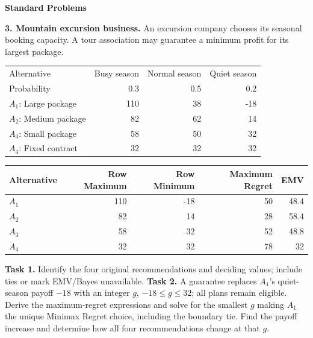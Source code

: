 \begin{studentproblem}
\textbf{Standard Problems}\par\smallskip
\textbf{3. Mountain excursion business.} An excursion company chooses its seasonal booking capacity. A tour association may guarantee a minimum profit for its largest package.
\begin{center}\begin{tabular}{lrrr}\toprule Alternative & Busy season & Normal season & Quiet season\\
Probability & 0.3 & 0.5 & 0.2\\
\midrule
$A_1$: Large package & 110 & 38 & -18\\
$A_2$: Medium package & 82 & 62 & 14\\
$A_3$: Small package & 58 & 50 & 32\\
$A_4$: Fixed contract & 32 & 32 & 32\\
\bottomrule\end{tabular}\end{center}
\begin{center}\begin{tabular}{lrrrr}\toprule Alternative & Row Maximum & Row Minimum & Maximum Regret & EMV\\\midrule
$A_1$ & 110 & -18 & 50 & 48.4\\
$A_2$ & 82 & 14 & 28 & 58.4\\
$A_3$ & 58 & 32 & 52 & 48.8\\
$A_4$ & 32 & 32 & 78 & 32\\
\bottomrule\end{tabular}\end{center}
\textbf{Task 1.} Identify the four original recommendations and deciding values; include ties or mark EMV/Bayes unavailable.
\choices
\textbf{Task 2.} A guarantee replaces $A_1$'s quiet-season payoff $-18$ with an integer $g$, $-18\leq g\leq32$; all plans remain eligible. Derive the maximum-regret expressions and solve for the smallest $g$ making $A_1$ the unique Minimax Regret choice, including the boundary tie. Find the payoff increase and determine how all four recommendations change at that $g$.
\tasktwobox
\end{studentproblem}

